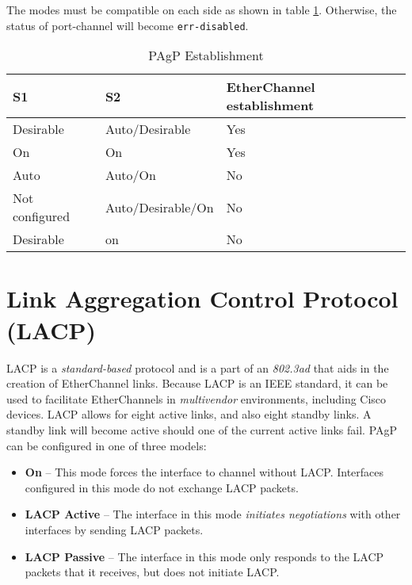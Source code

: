The modes must be compatible on each side as shown in table \ref{PAgP-mode}. Otherwise, the status of port-channel will become \verb|err-disabled|.


\begin{table}[htbp]
\centering \caption{PAgP Establishment}
\label{PAgP-mode}
\begin{tabular}{|l|l|l|}
\hline
S1             & S2                & EtherChannel establishment \\ \hline
Desirable      & Auto/Desirable    & Yes                        \\ \hline
On             & On                & Yes                        \\ \hline
Auto           & Auto/On           & No                         \\ \hline
Not configured & Auto/Desirable/On & No                         \\ \hline
Desirable      & on                & No                         \\ \hline
\end{tabular}
\end{table}



\section{Link Aggregation Control Protocol (LACP)}

LACP is a \emph{standard-based} protocol and is a part of an \emph{802.3ad} that aids in the  creation of EtherChannel links. Because LACP is an IEEE standard, it can be used to facilitate EtherChannels in \emph{multivendor} environments, including Cisco devices. LACP allows for eight active links, and also eight standby links. A standby link will become active should one of the current active links fail. PAgP can be configured in one of three models:

\begin{itemize}
\item \textbf{On} -- This mode forces the interface to channel without LACP. Interfaces configured in this mode do not exchange LACP packets.
\item \textbf{LACP Active} -- The interface in this mode \emph{initiates negotiations} with other interfaces by sending LACP packets.
\item \textbf{LACP Passive} -- The interface in this mode only responds to the LACP packets that it receives, but does not initiate  LACP.
\end{itemize}

